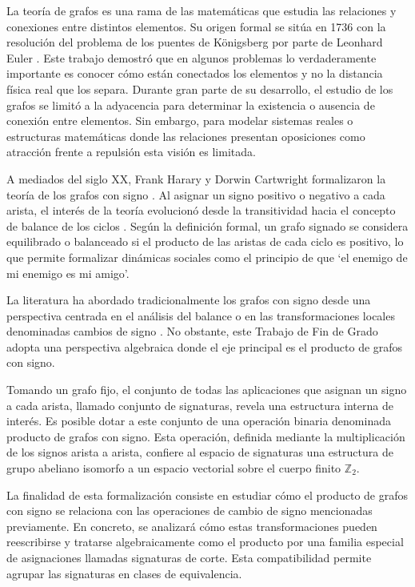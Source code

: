 \documentclass[11pt,a4paper,spanish]{report}
\theoremstyle{plain}
\begin{document}
La teoría de grafos es una rama de las matemáticas que estudia las relaciones y conexiones entre distintos elementos. Su origen formal se sitúa en 1736 con la resolución del problema de los puentes de Königsberg por parte de Leonhard Euler \cite{euler1741solutio}. Este trabajo demostró que en algunos problemas lo verdaderamente importante es conocer cómo están conectados los elementos y no la distancia física real que los separa. Durante gran parte de su desarrollo, el estudio de los grafos se limitó a la adyacencia para determinar la existencia o ausencia de conexión entre elementos. Sin embargo, para modelar sistemas reales o estructuras matemáticas donde las relaciones presentan oposiciones como atracción frente a repulsión esta visión es limitada.

A mediados del siglo XX, Frank Harary y Dorwin Cartwright formalizaron la teoría de los grafos con signo \cite{cartwright1977graph}. Al asignar un signo positivo o negativo a cada arista, el interés de la teoría evolucionó desde la transitividad hacia el concepto de balance de los ciclos \cite{harary1953notion}. Según la definición formal, un grafo signado se considera equilibrado o balanceado si el producto de las aristas de cada ciclo es positivo, lo que permite formalizar dinámicas sociales como el principio de que `el enemigo de mi enemigo es mi amigo'\cite{cartwright1956structural}.

La literatura ha abordado tradicionalmente los grafos con signo desde una perspectiva centrada en el análisis del balance o en las transformaciones locales denominadas cambios de signo \cite{zaslavsky1982signed}. No obstante, este Trabajo de Fin de Grado adopta una perspectiva algebraica donde el eje principal es el producto de grafos con signo. 


Tomando un grafo fijo, el conjunto de todas las aplicaciones que asignan un signo a cada arista, llamado conjunto de signaturas, revela una estructura interna de interés. Es posible dotar a este conjunto de una operación binaria denominada producto de grafos con signo. Esta operación, definida mediante la multiplicación de los signos arista a arista, confiere al espacio de signaturas una estructura de grupo abeliano isomorfo a un espacio vectorial sobre el cuerpo finito $\mathbb{Z}_2$.

La finalidad de esta formalización consiste en estudiar cómo el producto de grafos con signo se relaciona con las operaciones de cambio de signo mencionadas previamente. En concreto, se analizará cómo estas transformaciones pueden reescribirse y tratarse algebraicamente como el producto por una familia especial de asignaciones llamadas signaturas de corte. Esta compatibilidad  permite agrupar las signaturas en clases de equivalencia.
\end{document}
